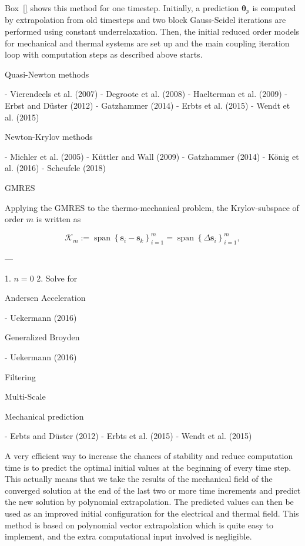 Box~\ref{} shows this method for one timestep. Initially, a prediction $\boldsymbol \theta_p$ is computed by extrapolation from old timesteps and two block Gauss-Seidel iterations are performed using constant underrelaxation. Then, the initial reduced order models for mechanical and thermal systems are set up and the main coupling iteration loop with computation steps as described above starts.

 Quasi-Newton methods

- Vierendeels et al. (2007)
- Degroote et al. (2008)
- Haelterman et al. (2009)
- Erbst and Düster (2012)
- Gatzhammer (2014)
- Erbts et al. (2015)
- Wendt et al. (2015)

 Newton-Krylov methods

- Michler et al. (2005)
- Küttler and Wall (2009)
- Gatzhammer (2014)
- König et al. (2016)
- Scheufele (2018)

 GMRES

Applying the GMRES to the thermo-mechanical problem, the Krylov-subspace of order $m$ is written as

$$
\mathcal{K}_{m}:=\operatorname{span}\left\{\boldsymbol{s}_{i}-\boldsymbol{s}_{k}\right\}_{i=1}^{m}=\operatorname{span}\left\{\Delta \boldsymbol{s}_{i}\right\}_{i=1}^{m},
$$

---

1. $n = 0$
2. Solve for

 Andersen Acceleration

- Uekermann (2016)

 Generalized Broyden

- Uekermann (2016)

 Filtering

 Multi-Scale

 Mechanical prediction

- Erbts and Düster (2012)
- Erbts et al. (2015)
- Wendt et al. (2015)

A very efficient way to increase the chances of stability and reduce computation time is to predict the optimal initial values at the beginning of every time step. This actually means that we take the results of the mechanical field of the converged solution at the end of the last two or more time increments and predict the new solution by polynomial extrapolation. The predicted values can then be used as an improved initial configuration for the electrical and thermal field. This method is based on polynomial vector extrapolation which is quite easy to implement, and the extra computational input involved is negligible.

